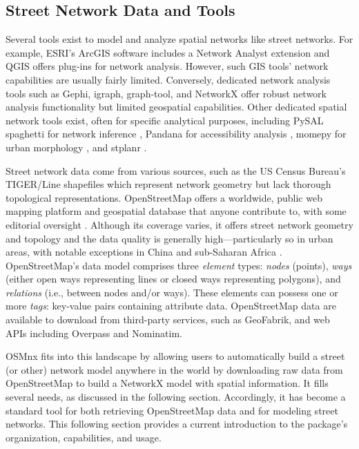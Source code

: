 \documentclass[12pt,letterpaper]{article} %
\begin{document}
\subsection{Street Network Data and Tools}

Several tools exist to model and analyze spatial networks like street networks. For example, ESRI's ArcGIS software includes a Network Analyst extension and QGIS offers plug-ins for network analysis. However, such GIS tools' network capabilities are usually fairly limited. Conversely, dedicated network analysis tools such as Gephi, igraph, graph-tool, and NetworkX offer robust network analysis functionality but limited geospatial capabilities. Other dedicated spatial network tools exist, often for specific analytical purposes, including PySAL spaghetti for network inference \citep{gaboardi_spaghetti_2021,rey_pysal_2022}, Pandana for accessibility analysis \citep{foti_behavioral_2014}, momepy for urban morphology \citep{fleischmann_momepy_2019}, and stplanr \citep{lovelace_stplanr_2019}.

Street network data come from various sources, such as the US Census Bureau's TIGER/Line shapefiles which represent network geometry but lack thorough topological representations. OpenStreetMap offers a worldwide, public web mapping platform and geospatial database that anyone contribute to, with some editorial oversight \citep{jokar_arsanjani_openstreetmap_2015}. Although its coverage varies, it offers street network geometry and topology and the data quality is generally high---particularly so in urban areas, with notable exceptions in China and sub-Saharan Africa \citep{barron_comprehensive_2014,barrington-leigh_worlds_2017}. OpenStreetMap's data model comprises three \textit{element} types: \textit{nodes} (points), \textit{ways} (either open ways representing lines or closed ways representing polygons), and \textit{relations} (i.e., between nodes and/or ways). These elements can possess one or more \textit{tags}: key-value pairs containing attribute data. OpenStreetMap data are available to download from third-party services, such as GeoFabrik, and web APIs including Overpass and Nominatim.

OSMnx fits into this landscape by allowing users to automatically build a street (or other) network model anywhere in the world by downloading raw data from OpenStreetMap to build a NetworkX model with spatial information. It fills several needs, as discussed in the following section. Accordingly, it has become a standard tool for both retrieving OpenStreetMap data and for modeling street networks. This following section provides a current introduction to the package's organization, capabilities, and usage.
\end{document}
